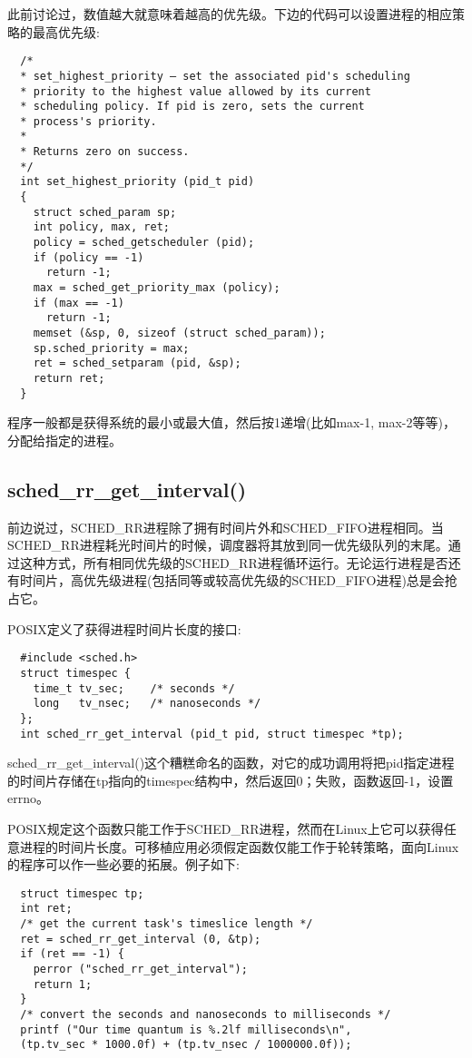   此前讨论过，数值越大就意味着越高的优先级。下边的代码可以设置进程的相应策略的最高优先级:

\begin{lstlisting}
  /*
  * set_highest_priority – set the associated pid's scheduling
  * priority to the highest value allowed by its current
  * scheduling policy. If pid is zero, sets the current
  * process's priority.
  *
  * Returns zero on success.
  */
  int set_highest_priority (pid_t pid)
  {
    struct sched_param sp;
    int policy, max, ret;
    policy = sched_getscheduler (pid);
    if (policy == -1)
      return -1;
    max = sched_get_priority_max (policy);
    if (max == -1)
      return -1;
    memset (&sp, 0, sizeof (struct sched_param));
    sp.sched_priority = max;
    ret = sched_setparam (pid, &sp);
    return ret;
  }
\end{lstlisting}

  程序一般都是获得系统的最小或最大值，然后按1递增(比如max-1, max-2等等)，分配给指定的进程。

\subsection{sched\_rr\_get\_interval()}

  前边说过，SCHED\_RR进程除了拥有时间片外和SCHED\_FIFO进程相同。当SCHED\_RR进程耗光时间片的时候，调度器将其放到同一优先级队列的末尾。通过这种方式，所有相同优先级的SCHED\_RR进程循环运行。无论运行进程是否还有时间片，高优先级进程(包括同等或较高优先级的SCHED\_FIFO进程)总是会抢占它。

  POSIX定义了获得进程时间片长度的接口:

\begin{lstlisting}
  #include <sched.h>
  struct timespec {
    time_t tv_sec;    /* seconds */
    long   tv_nsec;   /* nanoseconds */
  };
  int sched_rr_get_interval (pid_t pid, struct timespec *tp);
\end{lstlisting}

  sched\_rr\_get\_interval()这个糟糕命名的函数，对它的成功调用将把pid指定进程的时间片存储在tp指向的timespec结构中，然后返回0；失败，函数返回-1，设置errno。

  POSIX规定这个函数只能工作于SCHED\_RR进程，然而在Linux上它可以获得任意进程的时间片长度。可移植应用必须假定函数仅能工作于轮转策略，面向Linux的程序可以作一些必要的拓展。例子如下:

\begin{lstlisting}
  struct timespec tp;
  int ret;
  /* get the current task's timeslice length */
  ret = sched_rr_get_interval (0, &tp);
  if (ret == -1) {
    perror ("sched_rr_get_interval");
    return 1;
  }
  /* convert the seconds and nanoseconds to milliseconds */
  printf ("Our time quantum is %.2lf milliseconds\n",
  (tp.tv_sec * 1000.0f) + (tp.tv_nsec / 1000000.0f));
\end{lstlisting}

